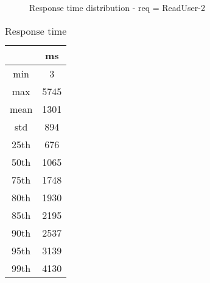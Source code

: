 \begin{minipage}{0.75\linewidth}
\begin{figure}[h]
\begin{adjustbox}{max width=1.0\linewidth, keepaspectratio}
  \end{adjustbox}
  \caption{Response time distribution - req = ReadUser-2}
\end{figure}
\end{minipage}\hfill\begin{minipage}{0.18\linewidth}
\begin{table}[h]
\begin{tabular}{|cc|}
\hline
\textbf{} & \textbf{ms}\\ \hline
 \Xhline{0.005\arrayrulewidth}
min & 3\\
 \Xhline{0.005\arrayrulewidth}
max & 5745\\
 \Xhline{0.005\arrayrulewidth}
mean & 1301\\
 \Xhline{0.005\arrayrulewidth}
std & 894\\
\hline
\hline
 \Xhline{0.005\arrayrulewidth}
25th & 676\\
 \Xhline{0.005\arrayrulewidth}
50th & 1065\\
 \Xhline{0.005\arrayrulewidth}
75th & 1748\\
 \Xhline{0.005\arrayrulewidth}
80th & 1930\\
 \Xhline{0.005\arrayrulewidth}
85th & 2195\\
 \Xhline{0.005\arrayrulewidth}
90th & 2537\\
 \Xhline{0.005\arrayrulewidth}
95th & 3139\\
 \Xhline{0.005\arrayrulewidth}
99th & 4130\\
\hline
\end{tabular}
\caption{Response time}
\end{table}
\end{minipage}\hfill